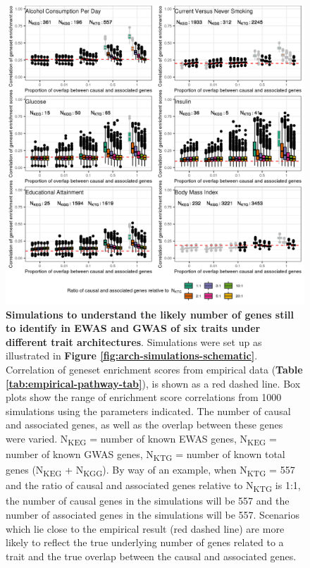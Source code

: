 \documentclass[11pt,oneside]{bristolthesis}
\begin{document}
\begin{figure}

{\centering \includegraphics[width=1\linewidth]{figure/06-ewas_gwas_comparison/architecture_sims_other_traits_corr} 

}

\caption[Simulations to understand the likely number of genes still to identify in EWAS and GWAS of six traits under different trait architectures]{\textbf{Simulations to understand the likely number of genes still to identify in EWAS and GWAS of six traits under different trait architectures}. Simulations were set up as illustrated in \textbf{Figure \ref{fig:arch-simulations-schematic}}. Correlation of geneset enrichment scores from empirical data (\textbf{Table \ref{tab:empirical-pathway-tab}}), is shown as a red dashed line. Box plots show the range of enrichment score correlations from 1000 simulations using the parameters indicated. The number of causal and associated genes, as well as the overlap between these genes were varied. N\textsubscript{KEG} = number of known EWAS genes, N\textsubscript{KEG} = number of known GWAS genes, N\textsubscript{KTG} = number of known total genes (N\textsubscript{KEG} + N\textsubscript{KGG}). By way of an example, when N\textsubscript{KTG} = 557 and the ratio of causal and associated genes relative to N\textsubscript{KTG} is 1:1, the number of causal genes in the simulations will be 557 and the number of associated genes in the simulations will be 557. Scenarios which lie close to the empirical result (red dashed line) are more likely to reflect the true underlying number of genes related to a trait and the true overlap between the causal and associated genes.}\label{fig:arch-simulations-supp-res}
\end{figure}
\end{document}
